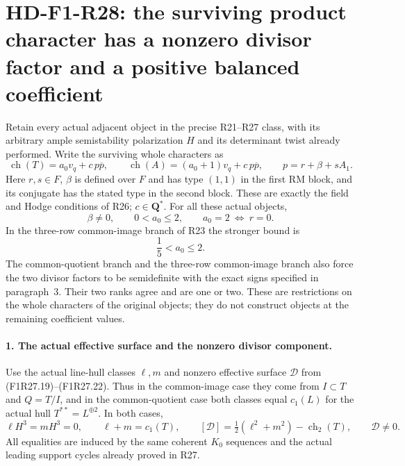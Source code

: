 \section[HD-F1-R28: the surviving product coefficient]{HD-F1-R28: the surviving product character has a nonzero divisor factor and a positive balanced coefficient}
\label{sec:followup-rm-product-character-coefficient}

Retain every actual adjacent object in the precise
R21--R27 class, with its arbitrary ample semistability
polarization $H$ and its determinant twist already
performed. Write the surviving whole characters as
\[
 \operatorname{ch}(T)=a_0v_q+c\,p\overline p,\qquad
 \operatorname{ch}(A)=(a_0+1)v_q+c\,p\overline p,\qquad
 p=r+\beta+sA_1.
 \tag{F1R28.1}
\]
Here $r,s\in F$, $\beta$ is defined over $F$ and
has type $(1,1)$ in the first RM block, and its
conjugate has the stated type in the second block.
These are exactly the field and Hodge conditions
of R26; $c\in\mathbf Q^*$.
For all these actual objects,
\[
       \beta\ne0,\qquad 0<a_0\le2,\qquad
                   a_0=2\ \Longleftrightarrow\ r=0.
 \tag{F1R28.2}
\]
In the three-row common-image branch of R23 the
stronger bound is
\[
                              \frac15<a_0\le2.
 \tag{F1R28.3}
\]
The common-quotient branch and the three-row
common-image branch also force the two divisor
factors to be semidefinite with the exact signs
specified in paragraph~3. Their two ranks agree
and are one or two. These are restrictions on
the whole characters of the original objects;
they do not construct objects at the remaining
coefficient values.

\paragraph{1. The actual effective surface and the nonzero divisor component.}
Use the actual line-hull classes $\ell,m$ and
nonzero effective surface $\mathcal D$ from
(F1R27.19)--(F1R27.22). Thus in the common-image
case they come from $I\subset T$ and $Q=T/I$,
and in the common-quotient case both classes
equal $c_1(L)$ for the actual hull
$T^{**}=L^{\oplus2}$. In both cases,
\[
 \ell H^3=mH^3=0,\qquad
 \ell+m=c_1(T),\qquad
 [\mathcal D]=\tfrac12(\ell^2+m^2)
                       -\operatorname{ch}_2(T),\qquad
                         \mathcal D\ne0.
 \tag{F1R28.4}
\]
All equalities are induced by the same coherent
$K_0$ sequences and the actual leading support
cycles already proved in R27.

